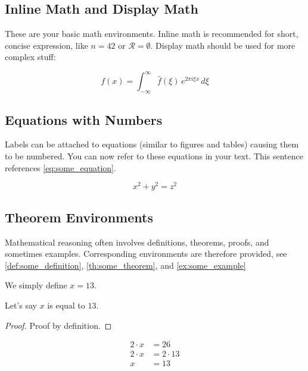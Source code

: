 \subsection{Inline Math and Display Math}

These are your basic math environments.
Inline math is recommended for short, concise expression, like $n = 42$ or $\mathcal{R} = \emptyset$.
Display math should be used for more complex stuff:

$$f(x) = \int_{-\infty}^\infty \hat f(\xi)\,e^{2 \pi i \xi x} \,d\xi$$

\subsection{Equations with Numbers}

Labels can be attached to equations (similar to figures and tables) causing them to be numbered.
You can now refer to these equations in your text.
This sentence references \cref{eq:some_equation}.

\begin{equation}
	x^2 + y^2 = z^2
	\label{eq:some_equation}
\end{equation}

\subsection{Theorem Environments}

Mathematical reasoning often involves definitions, theorems, proofs, and sometimes examples.
Corresponding environments are therefore provided, see \cref{def:some_definition}, \cref{th:some_theorem}, and \cref{ex:some_example}

\begin{definition}
	We simply define $x = 13$.
	\label{def:some_definition}
\end{definition}

\begin{theorem}
	Let's say $x$ is equal to $13$.
	\label{th:some_theorem}
\end{theorem}

\begin{proof}
	Proof by definition.
\end{proof}

\begin{example}
	\begin{align*}
		2 \cdot x &= 26\\
		2 \cdot x &= 2 \cdot 13\\
		x &= 13
	\end{align*}
	\label{ex:some_example}
\end{example}

